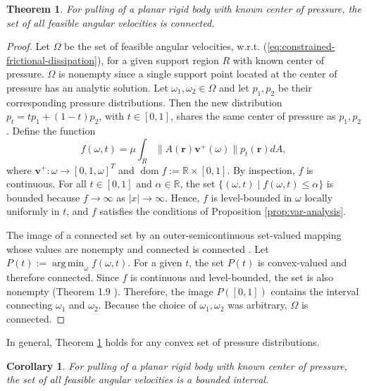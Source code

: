 \documentclass[conference]{IEEEtran}
\newtheorem{theorem}{Theorem}
\newtheorem{corollary}{Corollary}
\DeclareMathOperator*{\argmin}{arg\,min}
\DeclareMathOperator{\dom}{dom}
\begin{document}
\begin{theorem}\label{thm:angular-velocities}
  For pulling of a planar rigid body with known center of pressure,
  the set of all feasible angular velocities is connected.
\end{theorem}

\begin{proof}
  Let $\Omega$ be the set of feasible angular velocities,
  w.r.t. (\ref{eq:constrained-frictional-dissipation}), for a given
  support region $R$ with known center of pressure. $\Omega$ is
  nonempty since a single support point located at the center of
  pressure has an analytic solution. Let
  $\omega_1, \omega_2 \in \Omega$ and let $p_1, p_2$ be their
  corresponding pressure distributions. Then the new distribution
  $p_t = tp_1 + (1-t)p_2$, with $t \in [0,1]$, shares the same center
  of pressure as $p_1,p_2$. Define the function
  \begin{equation}
    f(\omega, t) = \mu\int_R\lVert A(\mathbf{r})\mathbf{v}^+(\omega)\rVert p_t(\mathbf{r})dA,
  \end{equation}
  where $\mathbf{v}^+: \omega \rightarrow [0,1,\omega]^T$ and
  $\dom f:= \mathbb{R}\times[0,1]$. By inspection, $f$ is
  continuous. For all $t \in [0,1]$ and $\alpha \in \mathbb{R}$, the
  set $\{(\omega,t)\;|\;f(\omega,t)\leq \alpha\}$ is bounded because
  $f \rightarrow \infty$ as $|x|\rightarrow \infty$. Hence, $f$ is
  level-bounded in $\omega$ locally uniformly in $t$, and $f$
  satisfies the conditions of Proposition \ref{prop:var-analysis}.

  The image of a connected set by an outer-semicontinuous set-valued
  mapping whose values are nonempty and connected is connected
  \cite{hiriart1985images}. Let $P(t) := \argmin_\omega f(\omega,t)$.
  For a given $t$, the set $P(t)$ is convex-valued and therefore
  connected. Since $f$ is continuous and level-bounded, the set is
  also nonempty (Theorem 1.9 \cite{Rockafellar}). Therefore, the image
  $P([0,1])$ contains the interval connecting $\omega_1$ and
  $\omega_2$. Because the choice of $\omega_1,\omega_2$ was arbitrary,
  $\Omega$ is connected.
\end{proof}
In general, Theorem \ref{thm:angular-velocities} holds for any convex
set of pressure distributions.  %

\begin{corollary}
  For pulling of a planar rigid body with known center of pressure,
  the set of all feasible angular velocities is a bounded interval.
\end{corollary}
\end{document}
